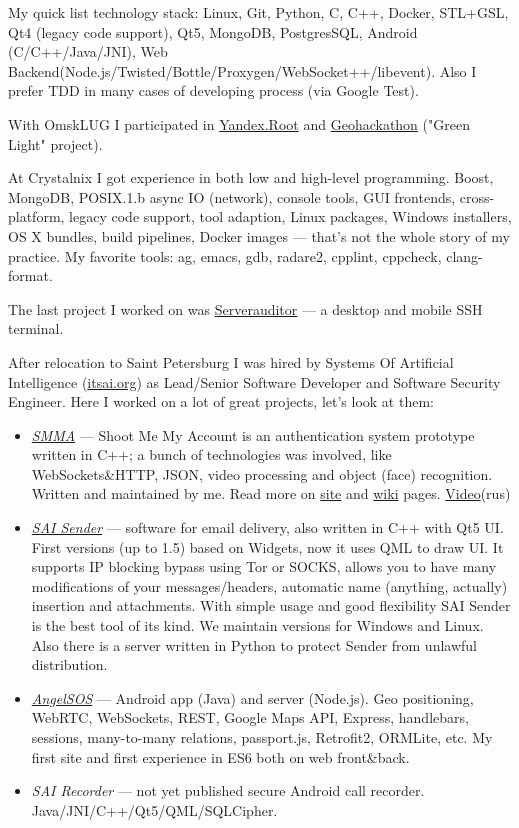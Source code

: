 \documentclass[letterpaper,11pt]{article}
\begin{document}
	My quick list technology stack: Linux, Git, Python, C, C++, Docker, STL+GSL, Qt4 (legacy code support), Qt5, MongoDB, PostgresSQL, Android (C/C++/Java/JNI), Web Backend(Node.js/Twisted/Bottle/Proxygen/WebSocket++/libevent). Also I prefer TDD in many cases of developing process (via Google Test).
	
	With OmskLUG I participated in \href{http://omsklug.com/members/chemtech/activity/759}{Yandex.Root} and \href{https://vk.com/geohackathon}{Geohackathon} ("Green Light" project).
	
	At Crystalnix I got experience in both low and high-level programming. Boost, MongoDB, POSIX.1.b async IO (network), console tools, GUI frontends, cross-platform, legacy code support, tool adaption, Linux packages, Windows installers, OS X bundles, build pipelines, Docker images --- that's not the whole story of my practice. My favorite tools: ag, emacs, gdb, radare2, cpplint, cppcheck, clang-format.
	
	The last project I worked on was \href{http://serverauditor.com/}{Serverauditor} --- a desktop and mobile SSH terminal.
	
	After relocation to Saint Petersburg I was hired by Systems Of Artificial Intelligence (\href{https://itsai.org}{itsai.org}) as Lead/Senior Software Developer and Software Security Engineer.
	Here I worked on a lot of great projects, let's look at them:
	\begin{itemize}
		\item \href{https://smma.pro/}{\emph{SMMA}} --- Shoot Me My Account is an authentication system prototype written in C++; a bunch of technologies was involved, like WebSockets\&HTTP, JSON, video processing and object (face) recognition. Written and maintained by me. Read more on \href{https://smma.pro/}{site} and \href{https://github.com/saicorp/SMMA/wiki}{wiki} pages. \href{https://youtu.be/X2SRc-d5yBA}{Video}(rus)
		\item \href{https://itsai.org/products/view/sai-sender}{\emph{SAI Sender}} --- software for email delivery, also written in C++ with Qt5 UI. First versions (up to 1.5) based on Widgets, now it uses QML to draw UI. It supports IP blocking bypass using Tor or SOCKS, allows you to have many modifications of your messages/headers, automatic name (anything, actually) insertion and attachments. With simple usage and good flexibility SAI Sender is the best tool of its kind. We maintain versions for Windows and Linux. Also there is a server written in Python to protect Sender from unlawful distribution.
		\item \href{https://angelsos.ru/}{\emph{AngelSOS}} --- Android app (Java) and server (Node.js). Geo positioning, WebRTC, WebSockets, REST, Google Maps API, Express, handlebars, sessions, many-to-many relations, passport.js, Retrofit2, ORMLite, etc. My first site and first experience in ES6 both on web front\&back.
		\item \emph{SAI Recorder} --- not yet published secure Android call recorder. Java/JNI/C++/Qt5/QML/SQLCipher.
	\end{itemize}
	
\end{document}

